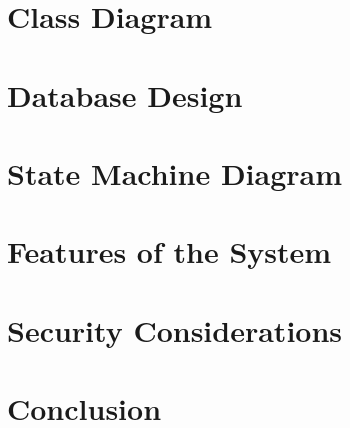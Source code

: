\documentclass[12pt,a4paper]{article}
\begin{document}
\section{Class Diagram}

\section{Database Design}

\section{State Machine Diagram}

\section{Features of the System}

\section{Security Considerations}

\section{Conclusion}
\end{document}
